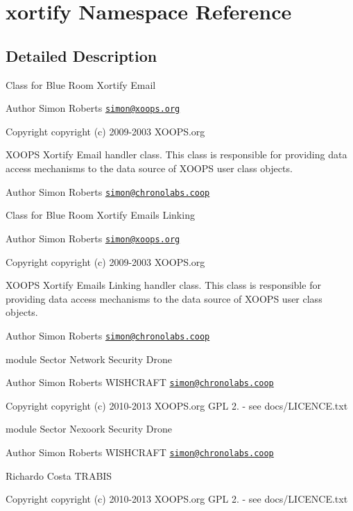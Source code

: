 \hypertarget{namespacexortify}{\section{xortify Namespace Reference}
\label{namespacexortify}
}


\subsection{Detailed Description}
Class for Blue Room Xortify Email \begin{DoxyAuthor}{Author}
Simon Roberts \href{mailto:simon@xoops.org}{\tt simon@xoops.\-org} 
\end{DoxyAuthor}
\begin{DoxyCopyright}{Copyright}
copyright (c) 2009-\/2003 X\-O\-O\-P\-S.\-org
\end{DoxyCopyright}
X\-O\-O\-P\-S Xortify Email handler class. This class is responsible for providing data access mechanisms to the data source of X\-O\-O\-P\-S user class objects.

\begin{DoxyAuthor}{Author}
Simon Roberts \href{mailto:simon@chronolabs.coop}{\tt simon@chronolabs.\-coop}
\end{DoxyAuthor}
Class for Blue Room Xortify Emails Linking \begin{DoxyAuthor}{Author}
Simon Roberts \href{mailto:simon@xoops.org}{\tt simon@xoops.\-org} 
\end{DoxyAuthor}
\begin{DoxyCopyright}{Copyright}
copyright (c) 2009-\/2003 X\-O\-O\-P\-S.\-org
\end{DoxyCopyright}
X\-O\-O\-P\-S Xortify Emails Linking handler class. This class is responsible for providing data access mechanisms to the data source of X\-O\-O\-P\-S user class objects.

\begin{DoxyAuthor}{Author}
Simon Roberts \href{mailto:simon@chronolabs.coop}{\tt simon@chronolabs.\-coop}
\end{DoxyAuthor}
module  Sector Network Security Drone \begin{DoxyAuthor}{Author}
Simon Roberts W\-I\-S\-H\-C\-R\-A\-F\-T \href{mailto:simon@chronolabs.coop}{\tt simon@chronolabs.\-coop} 
\end{DoxyAuthor}
\begin{DoxyCopyright}{Copyright}
copyright (c) 2010-\/2013 X\-O\-O\-P\-S.\-org  G\-P\-L 2. -\/ see docs/\-L\-I\-C\-E\-N\-C\-E.\-txt
\end{DoxyCopyright}
module  Sector Nexoork Security Drone \begin{DoxyAuthor}{Author}
Simon Roberts W\-I\-S\-H\-C\-R\-A\-F\-T \href{mailto:simon@chronolabs.coop}{\tt simon@chronolabs.\-coop} 

Richardo Costa T\-R\-A\-B\-I\-S 
\end{DoxyAuthor}
\begin{DoxyCopyright}{Copyright}
copyright (c) 2010-\/2013 X\-O\-O\-P\-S.\-org  G\-P\-L 2. -\/ see docs/\-L\-I\-C\-E\-N\-C\-E.\-txt 
\end{DoxyCopyright}
